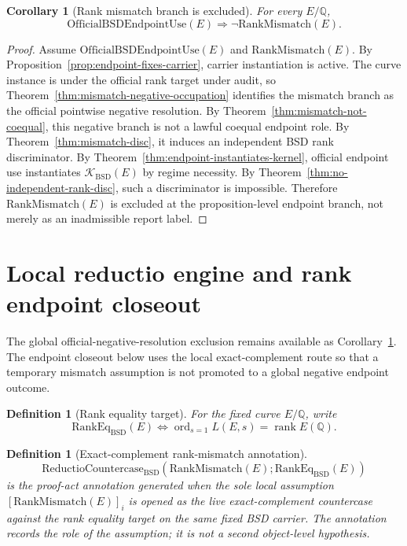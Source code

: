 \documentclass[11pt]{article}
\newtheorem{corollary}[theorem]{Corollary}
\newtheorem{definition}[theorem]{Definition}
\newcommand{\Q}{\mathbb{Q}}
\newcommand{\rank}{\operatorname{rank}}
\newcommand{\ord}{\operatorname{ord}}
\newcommand{\BSD}{\mathrm{BSD}}
\newcommand{\RankMismatch}{\mathrm{RankMismatch}}
\newcommand{\RankEq}{\mathrm{RankEq}_{\BSD}}
\newcommand{\ReductioBSD}{\mathrm{ReductioCountercase}_{\BSD}}
\newcommand{\Kern}{\mathcal{K}}
\begin{document}
\begin{corollary}[Rank mismatch branch is excluded]\label{cor:rank-mismatch-excluded}
For every $E/\Q$,
\[
\mathrm{OfficialBSDEndpointUse}(E)\Rightarrow \neg\RankMismatch(E).
\]
\end{corollary}

\begin{proof}
Assume $\mathrm{OfficialBSDEndpointUse}(E)$ and $\RankMismatch(E)$. By Proposition~\ref{prop:endpoint-fixes-carrier}, carrier instantiation is active. The curve instance is under the official rank target under audit, so Theorem~\ref{thm:mismatch-negative-occupation} identifies the mismatch branch as the official pointwise negative resolution. By Theorem~\ref{thm:mismatch-not-coequal}, this negative branch is not a lawful coequal endpoint role. By Theorem~\ref{thm:mismatch-disc}, it induces an independent BSD rank discriminator. By Theorem~\ref{thm:endpoint-instantiates-kernel}, official endpoint use instantiates $\Kern_{\BSD}(E)$ by regime necessity. By Theorem~\ref{thm:no-independent-rank-disc}, such a discriminator is impossible. Therefore $\RankMismatch(E)$ is excluded at the proposition-level endpoint branch, not merely as an inadmissible report label.
\end{proof}

\section{Local reductio engine and rank endpoint closeout}

The global official-negative-resolution exclusion remains available as Corollary~\ref{cor:rank-mismatch-excluded}. The endpoint closeout below uses the local exact-complement route so that a temporary mismatch assumption is not promoted to a global negative endpoint outcome.

\begin{definition}[Rank equality target]\label{def:rank-eq-target}
For the fixed curve $E/\Q$, write
\[
\RankEq(E)
\Longleftrightarrow
\ord_{s=1}L(E,s)=\rank E(\Q).
\]
\end{definition}

\begin{definition}[Exact-complement rank-mismatch annotation]\label{def:rank-reductio-annotation}
\[
\ReductioBSD(\RankMismatch(E);\RankEq(E))
\]
is the proof-act annotation generated when the sole local assumption $[\RankMismatch(E)]_i$ is opened as the live exact-complement countercase against the rank equality target on the same fixed BSD carrier. The annotation records the role of the assumption; it is not a second object-level hypothesis.
\end{definition}
\end{document}

